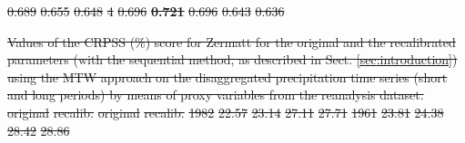 \documentclass[hess, manuscript]{copernicus}
\providecommand{\DIFdel}[1]{{\protect\color{red}\sout{#1}}}                      %
\providecommand{\DIFdelFL}[1]{\DIFdel{#1}} %
\providecommand{\DIFdelendFL}{} %
\begin{document}
\begin{table}[htb]
\DIFdelFL{0.689 }%
\DIFdelFL{0.655 }%
\DIFdelFL{0.648 }%
\DIFdelFL{4 }%
\DIFdelFL{0.696 }%
\textbf{\DIFdelFL{0.721}} %
\DIFdelFL{0.696 }%
\DIFdelFL{0.643 }%
\DIFdelFL{0.636 }%

{%
\DIFdelFL{Values of the CRPSS (\%) score for Zermatt for the original and the recalibrated parameters (with the sequential method, as described in Sect. \ref{sec:introduction}) using the MTW approach on the disaggregated precipitation time series (short and long periods) by means of proxy variables from the reanalysis dataset.}}
\DIFdelFL{original }%
\DIFdelFL{recalib. }%
\DIFdelFL{original }%
\DIFdelFL{recalib. }%
\DIFdelFL{1982 }%
\DIFdelFL{22.57 }%
\DIFdelFL{23.14 }%
\DIFdelFL{27.11 }%
\DIFdelFL{27.71 }%
\DIFdelFL{1961 }%
\DIFdelFL{23.81 }%
\DIFdelFL{24.38 }%
\DIFdelFL{28.42 }%
\DIFdelFL{28.86 }%
\DIFdelendFL \end{table}
\end{document}
